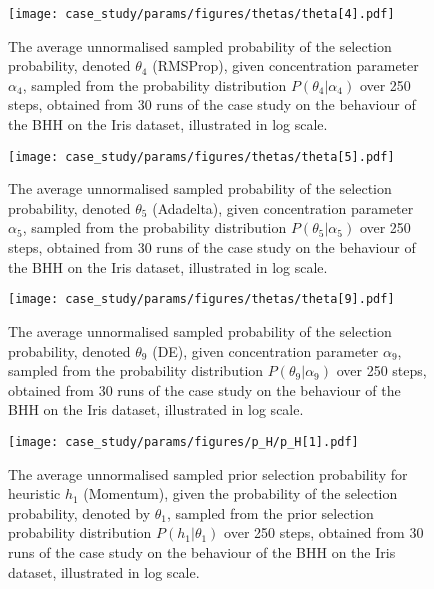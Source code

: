 \begin{figure}[htpb]
	\centering
	\texttt{[image: case\_study/params/figures/thetas/theta[4].pdf]}
	\caption{The average unnormalised sampled probability of the selection probability, denoted $\theta_{4}$ (\acs{RMSProp}), given concentration parameter $\alpha_{4}$, sampled from the probability distribution $P(\theta_{4} \vert \alpha_{4})$ over 250 steps, obtained from 30 runs of the case study on the behaviour of the \acs{BHH} on the Iris dataset, illustrated in log scale.}
	\label{fig:app:case_study_additional:theta:4}
\end{figure}

\begin{figure}[htpb]
	\centering
	\texttt{[image: case\_study/params/figures/thetas/theta[5].pdf]}
	\caption{The average unnormalised sampled probability of the selection probability, denoted $\theta_{5}$ (\acs{Adadelta}), given concentration parameter $\alpha_{5}$, sampled from the probability distribution $P(\theta_{5} \vert \alpha_{5})$ over 250 steps, obtained from 30 runs of the case study on the behaviour of the \acs{BHH} on the Iris dataset, illustrated in log scale.}
	\label{fig:app:case_study_additional:theta:5}
\end{figure}

\begin{figure}[htpb]
	\centering
	\texttt{[image: case\_study/params/figures/thetas/theta[9].pdf]}
	\caption{The average unnormalised sampled probability of the selection probability, denoted $\theta_{9}$ (\acs{DE}), given concentration parameter $\alpha_{9}$, sampled from the probability distribution $P(\theta_{9} \vert \alpha_{9})$ over 250 steps, obtained from 30 runs of the case study on the behaviour of the \acs{BHH} on the Iris dataset, illustrated in log scale.}
	\label{fig:app:case_study_additional:theta:9}
\end{figure}



\begin{figure}[htpb]
	\centering
	\texttt{[image: case\_study/params/figures/p\_H/p\_H[1].pdf]}
	\caption{The average unnormalised sampled prior selection probability for heuristic $h_{1}$ (\acs{Momentum}), given the probability of the selection probability, denoted by $\theta_{1}$, sampled from the prior selection probability distribution $P(h_{1} \vert \theta_{1})$ over 250 steps, obtained from 30 runs of the case study on the behaviour of the \acs{BHH} on the Iris dataset, illustrated in log scale.}
	\label{fig:app:case_study_additional:p_H:1}
\end{figure}

